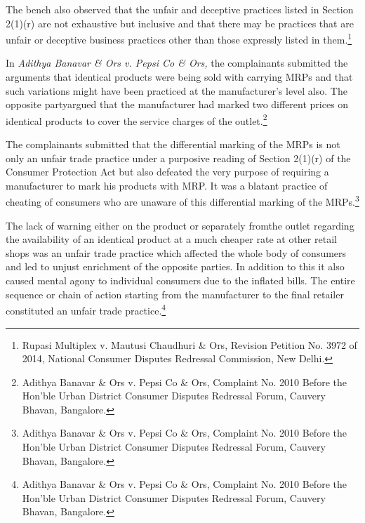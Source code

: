\begin{multicols}{2}
\noi
The bench also observed that the unfair and deceptive practices listed in Section 2(1)(r) are not
exhaustive but inclusive and that there may be practices that are unfair or deceptive business
practices other than those expressly listed in them.\footnote{Rupasi Multiplex v. Mautusi Chaudhuri \& Ors, Revision Petition No. 3972 of 2014, National Consumer Disputes Redressal Commission, New Delhi.}

\noi
In \textit{Adithya Banavar \& Ors v. Pepsi Co \& Ors,} the complainants submitted the arguments that
identical products were being sold with carrying MRPs and that such variations might have
been practiced at the manufacturer’s level also. The opposite partyargued that the manufacturer
had marked two different prices on identical products to cover the service charges of the
outlet.\footnote{Adithya Banavar \& Ors v. Pepsi Co \& Ors, Complaint No. 2010 Before the Hon’ble Urban District Consumer Disputes Redressal Forum, Cauvery Bhavan, Bangalore.}

\vspace{-.15cm}

\noi
The complainants submitted that the differential marking of the MRPs is not only an unfair
trade practice under a purposive reading of Section 2(1)(r) of the Consumer Protection Act but
also defeated the very purpose of requiring a manufacturer to mark his products with MRP. It
was a blatant practice of cheating of consumers who are unaware of this differential marking
of the MRPs.\footnote{Adithya Banavar \& Ors v. Pepsi Co \& Ors, Complaint No. 2010 Before the Hon’ble Urban District Consumer Disputes Redressal Forum, Cauvery Bhavan, Bangalore.}

\vspace{-.15cm}

\noi
The lack of warning either on the product or separately fromthe outlet regarding the availability
of an identical product at a much cheaper rate at other retail shops was an unfair trade practice
which affected the whole body of consumers and led to unjust enrichment of the opposite
parties. In addition to this it also caused mental agony to individual consumers due to the
inflated bills. The entire sequence or chain of action starting from the manufacturer to the final
retailer constituted an unfair trade practice.\footnote{Adithya Banavar \& Ors v. Pepsi Co \& Ors, Complaint No. 2010 Before the Hon’ble Urban District Consumer Disputes Redressal Forum, Cauvery Bhavan, Bangalore.}

\vspace{-.15cm}


\end{multicols}
